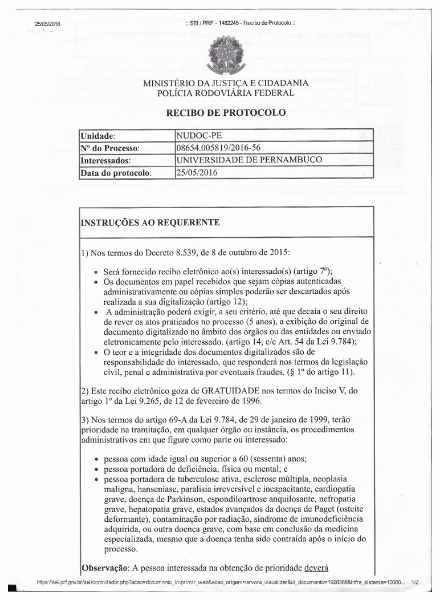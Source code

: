 \begin{figure}[ht!]
		\includegraphics[scale=0.25]{Figuras/Anexos/A1-PRFDadospg_004.pdf}
		\qquad \quad \quad

\end{figure}
